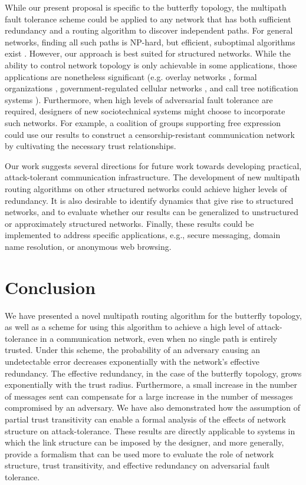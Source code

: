 \documentclass{sig-alternate-05-2015}
\begin{document}
While our present proposal is specific to the butterfly topology,
the multipath fault tolerance scheme could
be applied to any network that has both sufficient redundancy and a
routing algorithm to discover independent paths.
For general networks, finding all such paths is NP-hard,
but efficient, suboptimal algorithms exist
\cite{reiter_resilient_1998}.
However, our approach is best suited for structured networks.
While the ability to control network topology is only achievable in some
applications, those applications are nonetheless significant
(e.g. overlay networks \cite{lua_survey_2005, korzun_structured_2013},
formal organizations \cite{mohr_explaining_1982},
government-regulated cellular networks \cite{walker_mass_2012},
and call tree notification systems \cite{nickerson_thinking_2010}).
Furthermore, when high levels of adversarial fault tolerance are required,
designers of new sociotechnical systems might choose to
incorporate such networks.
For example,
a coalition of groups supporting free expression could use our results
to construct a censorship-resistant communication network
by cultivating the necessary trust relationships.

Our work suggests several directions for future work towards developing
practical, attack-tolerant communication infrastructure.
The development of new multipath routing algorithms on other structured
networks could achieve higher levels of redundancy.
It is also desirable to identify dynamics that give
rise to structured networks,
and to evaluate whether our results can be generalized to unstructured or
approximately structured networks.
Finally, these results could be implemented to address specific
applications, e.g., secure messaging, domain name resolution, or
anonymous web browsing.

\section{Conclusion}
\label{sec-conclusion}

We have presented a novel multipath routing algorithm for the butterfly
topology,
as well as a scheme for using this algorithm to achieve a high level of
attack-tolerance in a communication network,
even when no single path is entirely trusted.
Under this scheme, the probability of an adversary causing an undetectable error
decreases exponentially with the network's effective redundancy.
The effective redundancy, in the case of the butterfly topology,
grows exponentially with the trust radius.
Furthermore, a small increase in the number of messages sent can compensate
for a large increase in the number of messages compromised by an adversary.
We have also demonstrated how the assumption of partial trust
transitivity can enable a formal analysis of the effects of network structure
on attack-tolerance.
These results are directly applicable to systems in which the link
structure can be imposed by the designer,
and more generally, provide a formalism that can be used more to evaluate
the role of network structure, trust transitivity, and effective redundancy
on adversarial fault tolerance.
\end{document}
